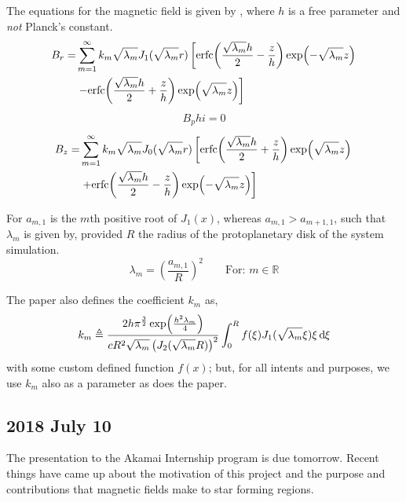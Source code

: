 \documentclass[twocolumn]{article}
\begin{document}
The equations for the magnetic field is given by \cite{Ewertowski_Basu_2013}, where $h$ is a free parameter and \textit{not} Planck's constant.
\begin{align}
	B_r =& \sum_{m=1}^{\infty} k_m \sqrt{\lambda_m} J_1(\sqrt{\lambda_m} r) \left\lbrack \erfc{\frac{\sqrt{\lambda_m} h}{2} - \frac{z}{h}} \exp{-\sqrt{\lambda_m} z} \right. \nonumber \\ 
	&\left. - \erfc{\frac{\sqrt{\lambda_m} h}{2} + \frac{z}{h}} \exp{\sqrt{\lambda_m} z} \right\rbrack
	\label{eq:Ewertowski_Basu_B_r_equation}
\end{align}
\begin{align}
	B_phi = 0
	\label{Ewertowski_Basu_B_phi_equation}
\end{align}
\begin{align}
	B_z =& \sum_{m=1}^{\infty} k_m \sqrt{\lambda_m} J_0(\sqrt{\lambda_m} r) \left\lbrack \erfc{\frac{\sqrt{\lambda_m} h}{2} + \frac{z}{h}} \exp{\sqrt{\lambda_m} z} \right.  \nonumber \\ 
	&\left. + \erfc{\frac{\sqrt{\lambda_m} h}{2} - \frac{z}{h}} \exp{-\sqrt{\lambda_m} z} \right\rbrack
	\label{eq:Ewertowski_Basu_B_z_equation}
\end{align}

For $a_{m,1}$ is the $m$th positive root of $J_1(x)$, whereas $a_{m,1} > a_{m+1,1}$, such that $\lambda_m$ is given by, provided $R$ the radius of the protoplanetary disk of the system simulation.
\begin{equation*}
	\lambda_m = \left( \frac{a_{m,1}}{R} \right)^2 \qquad \text{For: } m \in \mathbb{R}
\end{equation*}

The paper also defines the coefficient $k_m$ as,
\begin{equation*}
	k_m \triangleq \frac{2 h \pi^{\frac{3}{2}} \exp{\frac{h^2 \lambda_m}{4}}}{c R^2 \sqrt{\lambda_m} \left( J_2(\sqrt{\lambda_m} R) \right)^2} \int_0^R f(\xi) J_1(\sqrt{\lambda_m} \xi) \xi \diff{\xi}
\end{equation*}
with some custom defined function $f(x)$; but, for all intents and purposes, we use $k_m$ also as a parameter as does the paper.

\subsection{2018 July 10}
\label{subsec:2018_July_10}

The presentation to the Akamai Internship program is due tomorrow. Recent things have came up about the motivation of this project and the purpose and contributions that magnetic fields make to star forming regions.
\end{document}
